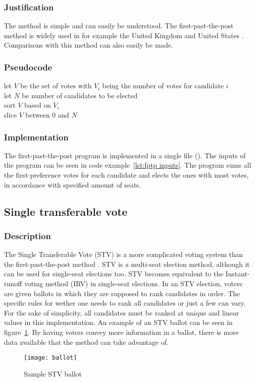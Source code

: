 \documentclass[12pt]{article}
\begin{document}
\subsubsection{Justification}
The method is simple and can easily be understood. The first-past-the-post method is widely used in for example the United Kingdom and United States \autocite{aceND}. Comparisons with this method can also easily be made.
\subsubsection{Pseudocode}
let $V$ be the set of votes with $V_{i}$ being the number of votes for candidate $i$ \\
let $N$ be number of candidates to be elected \\
sort $V$ based on $V_{i}$\\
slice $V$ between $0$ and $N$
\subsubsection{Implementation}
The first-past-the-post program is implemented in a single file (). The inputs of the program can be seen in code example~\ref{lst:fptp inputs}.
The program sums all the first-preference votes for each candidate and elects the ones with most votes, in accordance with specified amount of seats.
\subsection{Single transferable vote}
\subsubsection{Description}
The Single Transferable Vote (STV) is a more complicated voting system than the first-past-the-post method \autocite{electotal-reform-society2015}. STV is a multi-seat election method, although it can be used for single-seat elections too. STV becomes equivalent to the Instant-runoff voting method (IRV) in single-seat elections. In an STV election, voters are given ballots in which they are supposed to rank candidates in order. The specific rules for wether one needs to rank all candidates or just a few can vary. For the sake of simplicity, all candidates must be ranked at unique and linear values in this implementation. An example of an STV ballot can be seen in figure~\ref{fig:stv ballot}. By having voters convey more information in a ballot, there is more data available that the method can take advantage of. 
\begin{figure}
	\centering
	\texttt{[image: ballot]}
	\caption{Sample STV ballot}
\label{fig:stv ballot}
\end{figure}
\end{document}
